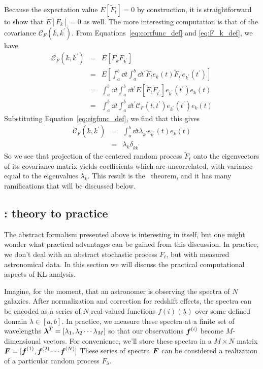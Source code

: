 Because the expectation value $E[\tilde{F}_t] = 0$ by construction, it
is straightforward to show that $E[F_k] = 0$ as well.  The more interesting
computation is that of the covariance $\mathcal{C}_F(k, k^\prime)$.
From Equations~\ref{eq:corrfunc_def} and \ref{eq:F_k_def}, we have
\begin{eqnarray}
  \mathcal{C}_F(k, k^\prime)
  &=& E[F_k F_{k^\prime}]\nonumber\\
  &=& E\left[\int_a^b \dd t \int_a^b \dd t^\prime
    \tilde{F}_t e_k(t)
    \tilde{F}_{t^\prime} e_{k^\prime}(t^\prime)\right] \nonumber\\
  &=& \int_a^b \dd t \int_a^b \dd t^\prime
    E[\tilde{F}_t \tilde{F}_{t^\prime}]
    e_{k^\prime}(t^\prime) e_k(t) \nonumber\\
  &=& \int_a^b \dd t \int_a^b \dd t^\prime
    \mathcal{C}_F(t, t^\prime)
    e_{k^\prime}(t^\prime) e_k(t) \nonumber
\end{eqnarray}
Substituting Equation~\ref{eq:eigfunc_def}, we find that this gives
\begin{eqnarray}
  \mathcal{C}_F(k, k^\prime)
  &=& \int_a^b \dd t \lambda_{k^\prime} e_{k^\prime}(t) e_k(t) \nonumber\\
  &=& \lambda_k \delta_{kk^\prime}
\end{eqnarray}
So we see that projection of the centered random process $\tilde{F}_t$ onto
the eigenvectors of its covariance matrix yields coefficients which
are uncorrelated, with variance equal to the eigenvalues $\lambda_k$.
This result is the \KL\ theorem, and it has many ramifications that will
be discussed below.

\subsection{\KL: theory to practice}
The abstract formalism presented above is interesting in itself, but one
might wonder what practical advantages can be gained from this discussion.
In practice, we don't deal with an abstract stochastic process $F_t$, but
with measured astronomical data.  In this section we will discuss the
practical computational aspects of KL analysis.

Imagine, for the moment, that an astronomer is observing the spectra of
$N$ galaxies.  After normalization and correction for redshift effects,
the spectra can be encoded as a series of $N$ real-valued functions
$f{(i)}(\lambda)$ over some defined domain $\lambda \in [a, b]$.
In practice, we measure these spectra at a finite set of wavelengths
$\boldsymbol{\lambda}^T = [\lambda_1, \lambda_2 \cdots \lambda_M]$ so that
our observations $\boldsymbol{f}^{(i)}$ become $M$-dimensional vectors.  For
convenience, we'll store these spectra in a $M \times N$ matrix
$\boldsymbol{F} = [\boldsymbol{f}^{(1)}, \boldsymbol{f}^{(2)} \cdots \boldsymbol{f}^{(N)}]$
These series of spectra $\boldsymbol{F}$ 
can be considered a realization of a particular
random process $F_\lambda$.

